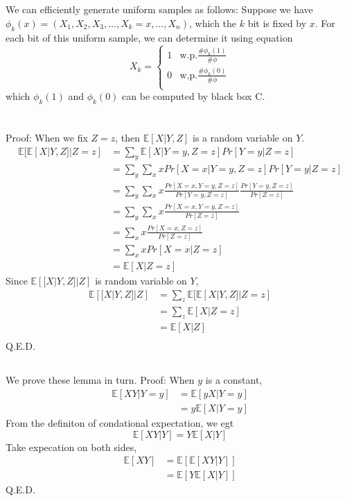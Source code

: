 \documentclass{article}
\begin{document}
	\subsection{}
	We can efficiently generate uniform samples as follows:
	Suppose we have $\phi_k(x)=(X_1,X_2,X_3,...,X_k=x,...,X_n)$, which the $k$ bit is fixed by $x$.
	For each bit of this uniform sample, we can determine it using equation
	$$
	X_k =
	\begin{cases}
	1 &\text{w.p.} \frac{{\#}\phi_k(1)}{\text{\#}\phi}\\
	0 &\text{w,p.} \frac{{\#}\phi_k(0)}{\text{\#}\phi}\\
	\end{cases}
	$$
	which $\phi_k(1)$ and $\phi_k(0)$ can be computed by black box C.

	\section{}
	\subsection{}
	Proof:
	When we fix $Z=z$, then $\mathbb{E}[X|Y,Z]$ is a random variable on $Y$.
	$$
	\begin{aligned}
	\mathbb{E}[\mathbb{E}[X|Y,Z]|Z=z]&=\sum_{y}\mathbb{E}[X|Y=y,Z=z]Pr[Y=y|Z=z]\\
	&=\sum_{y}\sum_{x}xPr[X=x|Y=y,Z=z]Pr[Y=y|Z=z]\\
	&=\sum_{y}\sum_{x}x\frac{Pr[X=x,Y=y,Z=z]}{Pr[Y=y,Z=z]}\frac{Pr[Y=y,Z=z]}{Pr[Z=z]}\\
	&=\sum_{y}\sum_{x}x\frac{Pr[X=x,Y=y,Z=z]}{Pr[Z=z]}\\
	&=\sum_{x}x\frac{Pr[X=x,Z=z]}{Pr[Z=z]}\\
	&=\sum_{x}xPr[X=x|Z=z]\\
	&=\mathbb{E}[X|Z=z]
	\end{aligned}
	$$
	Since $\mathbb{E}[\mathbb[X|Y,Z]|Z]$ is random variable on $Y$,
	$$
	\begin{aligned}
	\mathbb{E}[\mathbb[X|Y,Z]|Z]&=\sum_{z}\mathbb{E}[\mathbb{E}[X|Y,Z]|Z=z]\\
	&=\sum_{z}\mathbb{E}[X|Z=z]\\
	&=\mathbb{E}[X|Z]\\
	\end{aligned}
	$$
	Q.E.D.

	\subsection{}
	We prove these lemma in turn.
	Proof:
	When $y$ is a constant,
	$$
	\begin{aligned}
	\mathbb{E}[XY|Y=y]&=\mathbb{E}[yX|Y=y]\\
	&=y\mathbb{E}[X|Y=y]
	\end{aligned}
	$$
	From the definiton of condational expectation, we egt
	$$
	\mathbb{E}[XY|Y]=Y\mathbb{E}[X|Y]
	$$
	Take expecation on both sides,
	$$
	\begin{aligned}
	\mathbb{E}[XY]&=\mathbb{E}[\mathbb{E}[XY|Y]]\\
	&=\mathbb{E}[Y\mathbb{E}[X|Y]]
	\end{aligned}
	$$
	Q.E.D.
\end{document}
